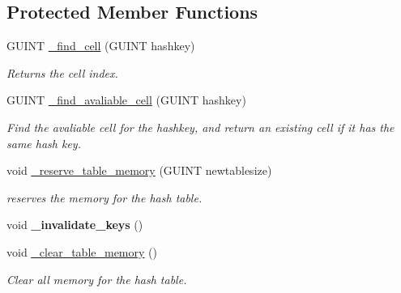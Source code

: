 \subsection*{Protected Member Functions}
\begin{DoxyCompactItemize}
\item 
\mbox{\label{classgim__hash__table_aaaff4cea9e6b86276d364041e651605f}} 
G\+U\+I\+NT \hyperlink{classgim__hash__table_aaaff4cea9e6b86276d364041e651605f}{\+\_\+find\+\_\+cell} (G\+U\+I\+NT hashkey)
\begin{DoxyCompactList}\small\item\em Returns the cell index. \end{DoxyCompactList}\item 
\mbox{\label{classgim__hash__table_acc2d3d29a0190232386fb155ec9e5d8f}} 
G\+U\+I\+NT \hyperlink{classgim__hash__table_acc2d3d29a0190232386fb155ec9e5d8f}{\+\_\+find\+\_\+avaliable\+\_\+cell} (G\+U\+I\+NT hashkey)
\begin{DoxyCompactList}\small\item\em Find the avaliable cell for the hashkey, and return an existing cell if it has the same hash key. \end{DoxyCompactList}\item 
void \hyperlink{classgim__hash__table_a4d9347e131c0e17ac2d4966c092817f8}{\+\_\+reserve\+\_\+table\+\_\+memory} (G\+U\+I\+NT newtablesize)
\begin{DoxyCompactList}\small\item\em reserves the memory for the hash table. \end{DoxyCompactList}\item 
\mbox{\label{classgim__hash__table_ab638970e2ec565cc9cfd473612127358}} 
void {\bfseries \+\_\+invalidate\+\_\+keys} ()
\item 
\mbox{\label{classgim__hash__table_a06933fdb198971dcd753564d1d6e9424}} 
void \hyperlink{classgim__hash__table_a06933fdb198971dcd753564d1d6e9424}{\+\_\+clear\+\_\+table\+\_\+memory} ()
\begin{DoxyCompactList}\small\item\em Clear all memory for the hash table. \end{DoxyCompactList}\item 
\mbox{\label{classgim__hash__table_aa33115e75d8cc5c489fa6ce8b1a23654}} 

\end{DoxyCompactItemize}
